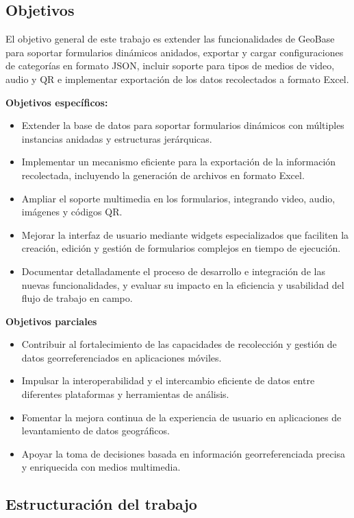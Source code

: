 \documentclass{article}
\begin{document}
\subsection{Objetivos}\label{objetivos}

El objetivo general de este trabajo es extender las funcionalidades de GeoBase para soportar formularios dinámicos anidados, exportar y cargar configuraciones de categorías en formato JSON, incluir soporte para tipos de medios de video, audio y QR e implementar exportación de los datos recolectados a formato Excel.

\textbf{Objetivos específicos:}
\begin{itemize}
    \item Extender la base de datos para soportar formularios dinámicos con múltiples instancias anidadas y estructuras jerárquicas.
    \item Implementar un mecanismo eficiente para la exportación de la información recolectada, incluyendo la generación de archivos en formato Excel.
    \item Ampliar el soporte multimedia en los formularios, integrando video, audio, imágenes y códigos QR.
    \item Mejorar la interfaz de usuario mediante widgets especializados que faciliten la creación, edición y gestión de formularios complejos en tiempo de ejecución.
    \item Documentar detalladamente el proceso de desarrollo e integración de las nuevas funcionalidades, y evaluar su impacto en la eficiencia y usabilidad del flujo de trabajo en campo.
\end{itemize}


\textbf{Objetivos parciales}
\begin{itemize}
    \item Contribuir al fortalecimiento de las capacidades de recolección y gestión de datos georreferenciados en aplicaciones móviles.
    \item Impulsar la interoperabilidad y el intercambio eficiente de datos entre diferentes plataformas y herramientas de análisis.
    \item Fomentar la mejora continua de la experiencia de usuario en aplicaciones de levantamiento de datos geográficos.
    \item Apoyar la toma de decisiones basada en información georreferenciada precisa y enriquecida con medios multimedia.
\end{itemize}

\subsection{Estructuración del
trabajo}\label{estructuraciuxf3n-del-trabajo}
\end{document}

